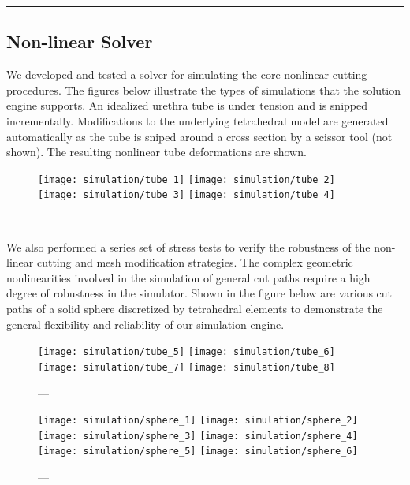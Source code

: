 \hrule%

\subsection{Non-linear Solver}\label{ssec:nonlinear_solver}
We developed and tested a solver for simulating the core nonlinear cutting procedures. The figures below illustrate the types of simulations that the solution engine supports. An idealized urethra tube is under tension and is snipped incrementally. Modifications to the underlying tetrahedral model are generated automatically as the tube is sniped around a cross section by a scissor tool (not shown). The resulting nonlinear tube deformations are shown.

\begin{figure}
  \centering%
	\texttt{[image: simulation/tube\_1]}\hfill%
	\texttt{[image: simulation/tube\_2]}\\[1.5ex]
	\texttt{[image: simulation/tube\_3]}\hfill%
	\texttt{[image: simulation/tube\_4]}\\
	\caption{---}\label{fig:tube}
\end{figure}

We also performed a series set of stress tests to verify the robustness of the non-linear cutting and mesh modification strategies. The complex geometric nonlinearities involved in the simulation of general cut paths require a high degree of robustness in the simulator. Shown in the figure below are various cut paths of a solid sphere discretized by tetrahedral elements to demonstrate the general flexibility and reliability of our simulation engine.

\begin{figure}
  \centering%
	\texttt{[image: simulation/tube\_5]}\hfill%
	\texttt{[image: simulation/tube\_6]}\hfill%
	\texttt{[image: simulation/tube\_7]}\hfill%
	\texttt{[image: simulation/tube\_8]}\\
	\caption{---}\label{fig:tube_stress}
\end{figure}

\begin{figure}
  \centering%
	\texttt{[image: simulation/sphere\_1]}\hfill%
	\texttt{[image: simulation/sphere\_2]}\\[1.5ex]
	\texttt{[image: simulation/sphere\_3]}\hfill%
	\texttt{[image: simulation/sphere\_4]}\\[1.5ex]
	\texttt{[image: simulation/sphere\_5]}\hfill%
	\texttt{[image: simulation/sphere\_6]}\\
	\caption{---}\label{fig:sphere}
\end{figure}

